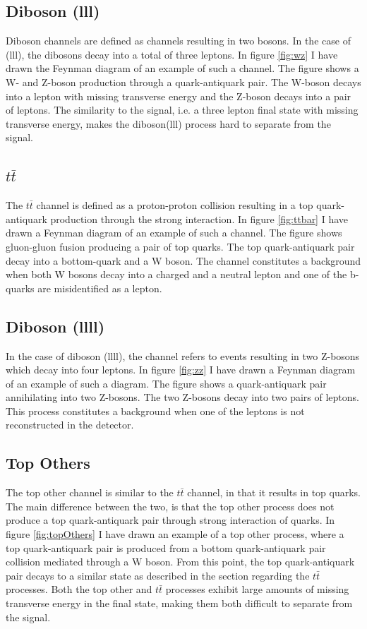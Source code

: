 \subsection*{Diboson (lll)}
Diboson channels are defined as channels resulting in two bosons. In the case of (lll), the dibosons
decay into a total of three leptons. In figure \ref{fig:wz} I have drawn the Feynman diagram of an 
example of such a channel. The figure shows a W- and Z-boson production through a quark-antiquark pair.
The W-boson decays into a lepton with missing transverse energy and the Z-boson decays into a pair of leptons.
The similarity to the signal, i.e. a three lepton final state with missing transverse energy, makes the diboson(lll)
process hard to separate from the signal.  

\subsection*{$t\bar{t}$}\label{subsec:ttbar}
The $t\bar{t}$ channel is defined as a proton-proton collision resulting in a top quark-antiquark production 
through the strong interaction. In figure \ref{fig:ttbar} I have drawn a Feynman diagram of an example of such 
a channel. The figure shows gluon-gluon fusion producing a pair of top quarks. The top quark-antiquark pair decay into 
a bottom-quark and a W boson. The channel constitutes a background when both W bosons decay into a charged and a 
neutral lepton and one of the b-quarks are misidentified as a lepton. 

\subsection*{Diboson (llll)}
In the case of diboson (llll), the channel refers to events resulting in two Z-bosons which decay 
into four leptons. In figure \ref{fig:zz} I have drawn a Feynman diagram of an example of 
such a diagram. The figure shows a quark-antiquark pair annihilating into two Z-bosons.
The two Z-bosons decay into two pairs of leptons. This process constitutes a background when one 
of the leptons is not reconstructed in the detector.

\subsection*{Top Others}
The top other channel is similar to the $t\bar{t}$ channel, in that it results in top quarks. The main difference between 
the two, is that the top other process does not produce a top quark-antiquark pair through strong interaction of quarks. 
In figure \ref{fig:topOthers} I have drawn an example of a top other process, where a top quark-antiquark pair is produced 
from a bottom quark-antiquark pair collision mediated through a W boson. From this point, the top quark-antiquark pair decays 
to a similar state as described in the section regarding the $t\bar{t}$ processes. Both the top other and $t\bar{t}$ processes exhibit
large amounts of missing transverse energy in the final state, making them both difficult to separate from the signal. 

